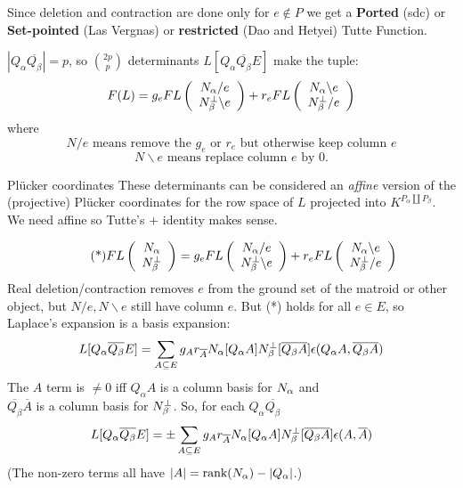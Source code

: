 \documentclass{beamer}
\newcommand{\dunion}{\coprod}
\begin{document}
\begin{frame}
  \begin{block}{Since deletion and contraction are done only for $e\not\in P$}
    we get a \textbf{Ported} (sdc) or \textbf{Set-pointed} (Las Vergnas) or
    \textbf{restricted} (Dao and Hetyei) Tutte Function.
  \end{block}

  
  $|Q_\alpha\overline{Q_\beta}|=p$, so $\binom{2p}{p}$ determinants $L[Q_\alpha \overline{Q_\beta} E]$ make the tuple:
  \[
  F(L) =
  g_eFL\left(\begin{array}{c} N_{\alpha}/e\\ N_{\beta}^{\perp}\backslash e \end{array} \right)
+
r_eFL\left(\begin{array}{c} N_{\alpha}\backslash e\\ N_{\beta}^{\perp}/e \end{array} \right)
\]
where
\[
N/e \text{\ means remove the\ } g_e \text{\ or\ } r_e \text{\ but otherwise keep column\ }e
\]
\[
N\backslash e \text{\ means replace column\ }e\text{\ by\ }0.
\]
\begin{block}{Pl\"{u}cker coordinates}
  These determinants can be considered an \emph{affine} version of the
  (projective) Pl\"{u}cker coordinates for the row space of $L$ projected
  into $K^{P_\alpha\dunion P_\beta}$.  We need affine so Tutte's $\mathbf{+}$ identity makes sense.
\end{block}
\end{frame}

\begin{frame}
    \begin{equation*}\tag{*}
  FL\left( \begin{array}{c} N_{\alpha}\\ N_{\beta}^{\perp} \end{array} \right) =
  g_eFL\left(\begin{array}{c} N_{\alpha}/e\\ N_{\beta}^{\perp}\backslash e \end{array} \right)
+
r_eFL\left(\begin{array}{c} N_{\alpha}\backslash e\\ N_{\beta}^{\perp}/e \end{array} \right)
    \end{equation*}
Real deletion/contraction removes $e$ from the ground set of the matroid or other
object, but $N/e,N\backslash e$ still have column $e$.  But (*) holds for all $e\in E$, so
Laplace's expansion is
a basis expansion:
\[
L[Q_\alpha \overline{Q_\beta} E] = \sum_{A\subseteq E}g_Ar_{\overline{A}}N_{\alpha}[Q_\alpha A]N_{\beta}^{\perp}[\overline{Q_\beta}\overline{A}]
\epsilon(Q_\alpha A,\overline{Q_\beta}\overline{A})
\]
The $A$ term is $\neq 0$ iff $Q_\alpha A$ is a column basis for $N_{\alpha}$ and \\
$\overline{Q_\beta} \overline{A}$ is a column basis for $N_{\beta}^{\perp}$.
So, for each $Q_\alpha \overline{Q_\beta} $
\[
L[Q_\alpha \overline{Q_\beta} E] =
\pm\sum_{A\subseteq E}g_Ar_{\overline{A}}N_{\alpha}[Q_\alpha A]N_{\beta}^{\perp}[\overline{Q_\beta}\overline{A}]
\epsilon(A,\overline{A})
\]
(The non-zero terms all have $|A|=\text{rank}(N_{\alpha})-|Q_\alpha|$.)
\end{frame}
\end{document}
